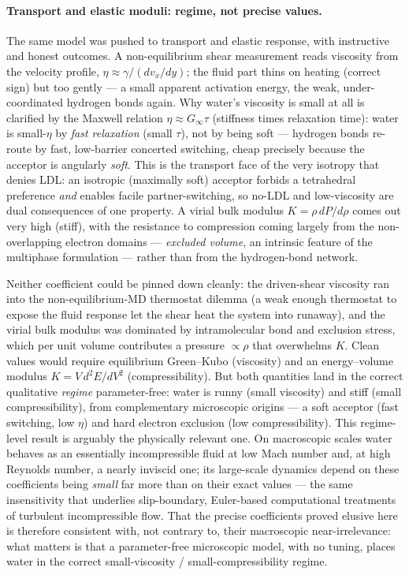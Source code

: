 \documentclass[11pt]{article}
\begin{document}
\paragraph{Transport and elastic moduli: regime, not precise values.} The same model was pushed to
transport and elastic response, with instructive and honest outcomes. A non-equilibrium shear
measurement reads viscosity from the velocity profile, $\eta \approx \gamma/(dv_x/dy)$; the fluid
part thins on heating (correct sign) but too gently --- a small apparent activation energy, the
weak, under-coordinated hydrogen bonds again. Why water's viscosity is small at all is clarified by
the Maxwell relation $\eta \approx G_\infty \tau$ (stiffness times relaxation time): water is small-$\eta$
by \emph{fast relaxation} (small $\tau$), not by being soft --- hydrogen bonds re-route by fast,
low-barrier concerted switching, cheap precisely because the acceptor is angularly \emph{soft}. This
is the transport face of the very isotropy that denies LDL: an isotropic (maximally soft) acceptor
forbids a tetrahedral preference \emph{and} enables facile partner-switching, so no-LDL and
low-viscosity are dual consequences of one property. A virial bulk modulus $K = \rho\,dP/d\rho$ comes
out very high (stiff), with the resistance to compression coming largely from the non-overlapping
electron domains --- \emph{excluded volume}, an intrinsic feature of the multiphase formulation ---
rather than from the hydrogen-bond network.

Neither coefficient could be pinned down cleanly: the driven-shear viscosity ran into the
non-equilibrium-MD thermostat dilemma (a weak enough thermostat to expose the fluid response let the
shear heat the system into runaway), and the virial bulk modulus was dominated by intramolecular
bond and exclusion stress, which per unit volume contributes a pressure $\propto\rho$ that overwhelms
$K$. Clean values would require equilibrium Green--Kubo (viscosity) and an energy--volume modulus
$K = V\,d^2E/dV^2$ (compressibility). But both quantities land in the correct qualitative
\emph{regime} parameter-free: water is runny (small viscosity) and stiff (small compressibility),
from complementary microscopic origins --- a soft acceptor (fast switching, low $\eta$) and hard
electron exclusion (low compressibility). This regime-level result is arguably the physically
relevant one. On macroscopic scales water behaves as an essentially incompressible fluid at low Mach
number and, at high Reynolds number, a nearly inviscid one; its large-scale dynamics depend on these
coefficients being \emph{small} far more than on their exact values --- the same insensitivity that
underlies slip-boundary, Euler-based computational treatments of turbulent incompressible flow. That
the precise coefficients proved elusive here is therefore consistent with, not contrary to, their
macroscopic near-irrelevance: what matters is that a parameter-free microscopic model, with no
tuning, places water in the correct small-viscosity / small-compressibility regime.
\end{document}
